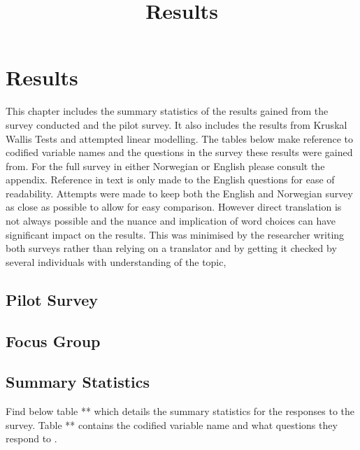 

\title{Results}

\chapter{Results}
This chapter includes the summary statistics of the results gained from the survey conducted and the pilot survey. It also includes the results from Kruskal Wallis Tests and attempted linear modelling. The tables below make reference to codified variable names and the questions in the survey these results were gained from. For the full survey in either Norwegian or English please consult the appendix. Reference in text is only made to the English questions for ease of readability. Attempts were made to keep both the English and Norwegian survey as close as possible to allow for easy comparison. However direct translation is not always possible and the nuance and implication of word choices can have significant impact on the results. This was minimised by the researcher writing both surveys rather than relying on a translator and by getting it checked by several individuals with understanding of the topic,

\section{Pilot Survey}

\section{Focus Group}

\section{Summary Statistics }
Find below table ** which details the summary statistics for the responses to the survey. Table ** contains the codified variable name and what questions they respond to .



